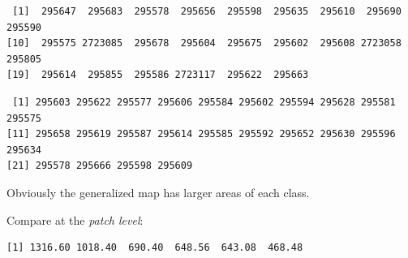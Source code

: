 \documentclass[
  letterpaper,
  DIV=11,
  numbers=noendperiod]{scrartcl}
\newenvironment{Shaded}{\begin{snugshade}}{\end{snugshade}}
\newcommand{\AttributeTok}[1]{\textcolor[rgb]{0.40,0.45,0.13}{#1}}
\newcommand{\CommentTok}[1]{\textcolor[rgb]{0.37,0.37,0.37}{#1}}
\newcommand{\ConstantTok}[1]{\textcolor[rgb]{0.56,0.35,0.01}{#1}}
\newcommand{\DecValTok}[1]{\textcolor[rgb]{0.68,0.00,0.00}{#1}}
\newcommand{\FloatTok}[1]{\textcolor[rgb]{0.68,0.00,0.00}{#1}}
\newcommand{\FunctionTok}[1]{\textcolor[rgb]{0.28,0.35,0.67}{#1}}
\newcommand{\NormalTok}[1]{\textcolor[rgb]{0.00,0.23,0.31}{#1}}
\newcommand{\OtherTok}[1]{\textcolor[rgb]{0.00,0.23,0.31}{#1}}
\newcommand{\SpecialCharTok}[1]{\textcolor[rgb]{0.37,0.37,0.37}{#1}}
\newcommand{\StringTok}[1]{\textcolor[rgb]{0.13,0.47,0.30}{#1}}
\begin{document}
\begin{Shaded}
\end{Shaded}

\begin{verbatim}
 [1]  295647  295683  295578  295656  295598  295635  295610  295690  295590
[10]  295575 2723085  295678  295604  295675  295602  295608 2723058  295805
[19]  295614  295855  295586 2723117  295622  295663
\end{verbatim}

\begin{Shaded}
\end{Shaded}

\begin{verbatim}
 [1] 295603 295622 295577 295606 295584 295602 295594 295628 295581 295575
[11] 295658 295619 295587 295614 295585 295592 295652 295630 295596 295634
[21] 295578 295666 295598 295609
\end{verbatim}

Obviously the generalized map has larger areas of each class.

Compare at the \emph{patch level}:

\begin{Shaded}
\end{Shaded}

\begin{verbatim}
[1] 1316.60 1018.40  690.40  648.56  643.08  468.48
\end{verbatim}
\end{document}
